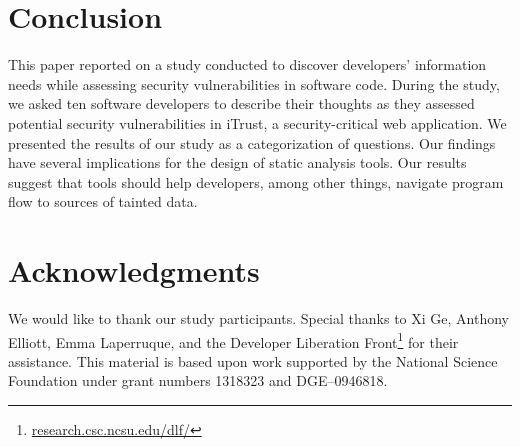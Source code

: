 \documentclass{sig-alternate}
\newcommand{\blind}[1]{#1}
\begin{document}
\section{Conclusion}
\label{sec:concl}
This paper reported on a study conducted to discover developers' information needs while assessing security vulnerabilities in software code.
During the study, we asked ten software developers to describe their thoughts as they assessed potential security vulnerabilities in iTrust, a security-critical web application.
We presented the results of our study as a categorization of questions.
Our findings have several implications for the design of static analysis tools. Our results suggest that tools should help developers, among other things, navigate program flow to sources of tainted data.







\section*{Acknowledgments}

We would like to thank our study participants. 
Special thanks to Xi Ge, Anthony Elliott, Emma Laperruque, and the Developer Liberation Front\footnote{\blind{\url{research.csc.ncsu.edu/dlf/}}} for their assistance. 
This material is based upon work supported by the National Science Foundation under grant numbers 1318323 and DGE--0946818.


%



\end{document}
